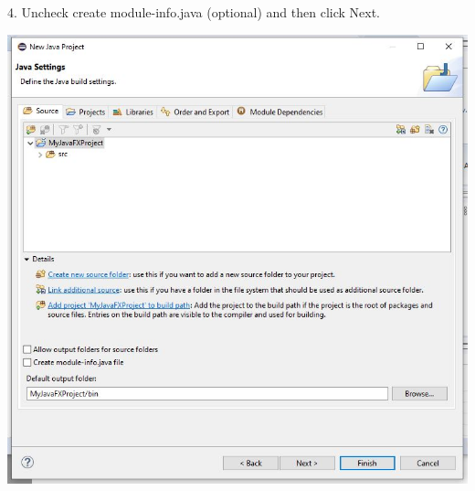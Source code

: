 \documentclass{beamer}
\begin{document}
\begin{frame}
        
        4.  Uncheck create module-info.java (optional) and then click Next.

        \begin{center}
            \includegraphics[scale=.35]{java_settings.jpg}
        \end{center}
\end{frame}
\end{document}
